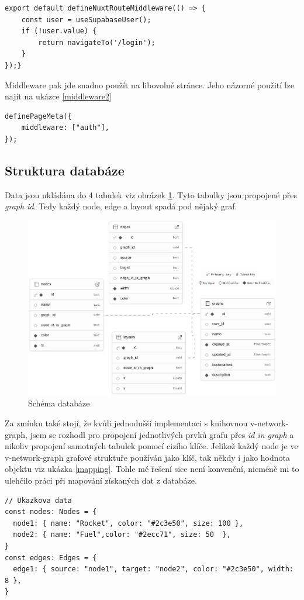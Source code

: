 \begin{lstlisting}[style=JavaScript, firstnumber = 1, caption={middleware/auth.js, middleware}, label={middleware}]
export default defineNuxtRouteMiddleware(() => {
    const user = useSupabaseUser();
    if (!user.value) {
        return navigateTo('/login');
    }
});}
\end{lstlisting}
Middleware pak jde snadno použít na libovolné stránce. Jeho názorné použití lze najít na ukázce \ref{middleware2}
\begin{lstlisting}[style=JavaScript, firstnumber = 2, caption={pages/profile.vue, ověření přihlášeného uživatele}, label={middleware2}]
definePageMeta({
    middleware: ["auth"],
});
\end{lstlisting}
\subsection{Struktura databáze}
Data jsou ukládána do 4 tabulek viz obrázek \ref{fig:scheme}. Tyto tabulky jsou propojené přes \textit{graph id}. Tedy každý node, edge a layout spadá pod nějaký graf.

\begin{figure}[h]
    \centering
    \includegraphics[width=1.1\linewidth]{Images/scheme.png}
    \caption{Schéma databáze}
    \label{fig:scheme}
\end{figure}
Za zmínku také stojí, že kvůli jednodušší implementaci s knihovnou v-network-graph, jsem se rozhodl pro propojení jednotlivých prvků grafu přes \textit{id in graph} a nikoliv propojení samotných tabulek pomocí cizího klíče. Jelikož každý node je ve v-network-graph grafové struktuře používán jako klíč, tak někdy i jako hodnota objektu viz ukázka \ref{mapping}. Tohle mé řešení sice není konvenční, nicméně mi to ulehčilo práci při mapování získaných dat z databáze.
\begin{lstlisting}[style=JavaScript, firstnumber = 1, caption={Demonstrace problému s mapováním}, label={mapping}]
// Ukazkova data
const nodes: Nodes = {
  node1: { name: "Rocket", color: "#2c3e50", size: 100 },
  node2: { name: "Fuel",color: "#2ecc71", size: 50  },
}
const edges: Edges = {
  edge1: { source: "node1", target: "node2", color: "#2c3e50", width: 8 },
}

\end{lstlisting}
